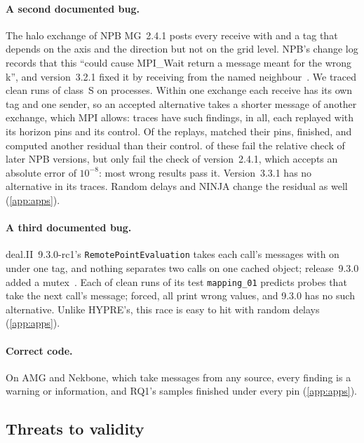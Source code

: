 \paragraph{A second documented bug.} The halo exchange of NPB MG~2.4.1 posts every receive
with \anysrc and a tag that depends on the axis and the direction but not on the grid level.
NPB's change log records that this ``could cause MPI\_Wait return a message meant for the
wrong k'', and version~3.2.1 fixed it by receiving from the named
neighbour~\citep{npb-changelog}. We traced \nMGTraced clean runs of class~S on \nMGRanks
processes. Within one exchange each receive has its own tag and one sender, so an accepted
alternative takes a shorter message of another exchange, which MPI allows: \nMGExposed traces
have such \Lone findings, \nMGAlts in all, each replayed with its horizon pins and its
control. Of the \nMGReplayed replays, \nMGMatched matched their pins,
\nMGFinished finished, and \nMGChanged computed another residual than their control.
\nMGFailRel of these fail the relative check of later NPB versions, but only \nMGFailAbs fail
the check of version~2.4.1, which accepts an absolute error of $10^{-8}$: most wrong results
pass it. Version~3.3.1 has no alternative in its \nMGFixedTraced traces. Random delays and
NINJA change the residual as well (\cref{app:apps}).

\paragraph{A third documented bug.} deal.II~9.3.0-rc1's \texttt{RemotePointEvaluation} takes
each call's messages with  on \anysrc under one tag, and nothing separates two
calls on one cached object; release~9.3.0 added a mutex~\citep{dealii-pr12363}. Each of
\nDealTraced clean runs of its test \texttt{mapping\_01} predicts probes that take the next
call's message; forced, all \nDealReplayed print wrong values, and 9.3.0 has no such
alternative. Unlike HYPRE's, this race is easy to hit with random delays (\cref{app:apps}).

\paragraph{Correct code.} On AMG and Nekbone, which take messages from any source, every
finding is a warning or information, and RQ1's samples finished under every pin (\cref{app:apps}).

\subsection{Threats to validity}

